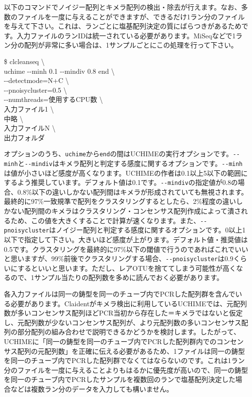 \documentclass[titlepage,10pt,a4paper,english]{jsbook}
\newenvironment{cmd}{\begin{oframed}\raggedright\ttfamily\footnotesize\setlength{\baselineskip}{1.4em}}{\end{oframed}\vspace{-1em}}
\begin{document}
以下のコマンドでノイジー配列とキメラ配列の検出・除去が行えます。なお、多数のファイルを一度に与えることができますが、できるだけ1ラン分のファイルを与えて下さい。これは、ランごとに塩基配列決定の質にばらつきがあるためです。入力ファイルのランIDは統一されている必要があります。MiSeqなどで1ラン分の配列が非常に多い場合は、1サンプルごとにこの処理を行って下さい。
\begin{cmd}
\$ clcleanseq {\textbackslash}\\
uchime {-}{-}minh 0.1 {-}{-}mindiv 0.8 end {\textbackslash}\\
{-}{-}detectmode=N+C {\textbackslash}\\
{-}{-}pnoisycluster=0.5 {\textbackslash}\\
{-}{-}numthreads=使用するCPU数 {\textbackslash}\\
入力ファイル1 {\textbackslash}\\
中略 {\textbackslash}\\
入力ファイルN {\textbackslash}\\
出力フォルダ
\end{cmd}
オプションのうち、\texttt{uchime}から\texttt{end}の間はUCHIMEの実行オプションです。\texttt{{-}{-}minh}と\texttt{{-}{-}mindiv}はキメラ配列と判定する感度に関するオプションです。\texttt{{-}{-}minh}は値が小さいほど感度が高くなります。UCHIMEの作者は0.1以上5以下の範囲にするよう推奨しています。デフォルト値は0.1です。\texttt{{-}{-}mindiv}の指定値が0.8の場合、0.8\%以下の違いしかない配列間はキメラが形成されていても無視されます。最終的に97\%一致規準で配列をクラスタリングするとしたら、2\%程度の違いしかない配列間のキメラはクラスタリング・コンセンサス配列作成によって潰されるため、この値を大きくすることで計算が速くなります。また、\texttt{{-}{-}pnoisycluster}はノイジー配列と判定する感度に関するオプションです。0以上1以下で指定して下さい。大きいほど感度が上がります。デフォルト値・推奨値は0.5です。クラスタリングを最終的に97\%以下の閾値で行うのであればこれでいいと思いますが、99\%前後でクラスタリングする場合、\texttt{{-}{-}pnoisycluster}は0.9くらいにするといいと思います。ただし、レアOTUを捨ててしまう可能性が高くなるので、1サンプル当たりの配列数を多めに読んでおく必要があります。

各入力ファイルは同一の鋳型を同一のチューブ内でPCRした配列群を含んでいる必要があります。Claidentがキメラ検出に利用しているUCHIMEでは、元配列数が多いコンセンサス配列ほどPCR当初から存在した＝キメラではないと仮定し、元配列数が少ないコンセンサス配列が、より元配列数の多いコンセンサス配列の部分配列の組み合わせで説明できるかどうかを検討します。したがって、UCHIMEに「同一の鋳型を同一のチューブ内でPCRした配列群内でのコンセンサス配列の元配列数」を正確に伝える必要があるため、1ファイルは同一の鋳型を同一のチューブ内でPCRした配列群でなくてはならないのです。これは1ラン分のファイルを一度に与えることよりもはるかに優先度が高いので、同一の鋳型を同一のチューブ内でPCRしたサンプルを複数回のランで塩基配列決定した場合などは複数ラン分のデータを入力しても構いません。
\end{document}
